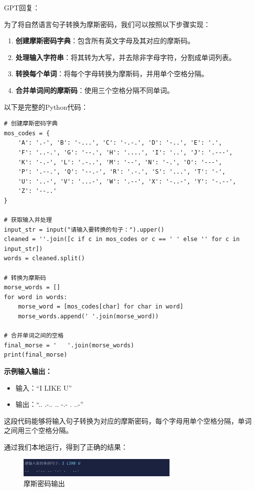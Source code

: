 GPT回复：

为了将自然语言句子转换为摩斯密码，我们可以按照以下步骤实现：

\begin{enumerate}
  \def\labelenumi{\arabic{enumi}.}
  \item
        \textbf{创建摩斯密码字典}：包含所有英文字母及其对应的摩斯码。
  \item
        \textbf{处理输入字符串}：将其转为大写，并去除非字母字符，分割成单词列表。
  \item
        \textbf{转换每个单词}：将每个字母转换为摩斯码，并用单个空格分隔。
  \item
        \textbf{合并单词间的摩斯码}：使用三个空格分隔不同单词。
\end{enumerate}

以下是完整的Python代码：

\begin{lstlisting}
# 创建摩斯密码字典
mos_codes = {
    'A': '.-', 'B': '-...', 'C': '-.-.', 'D': '-..', 'E': '.', 
    'F': '..-.', 'G': '--.', 'H': '....', 'I': '..', 'J': '.---', 
    'K': '-.-', 'L': '.-..', 'M': '--', 'N': '-.', 'O': '---', 
    'P': '.--.', 'Q': '--.-', 'R': '.-.', 'S': '...', 'T': '-', 
    'U': '..-', 'V': '...-', 'W': '.--', 'X': '-..-', 'Y': '-.--', 
    'Z': '--..'
}

# 获取输入并处理
input_str = input("请输入要转换的句子：").upper()
cleaned = ''.join([c if c in mos_codes or c == ' ' else '' for c in input_str])
words = cleaned.split()

# 转换为摩斯码
morse_words = []
for word in words:
    morse_word = [mos_codes[char] for char in word]
    morse_words.append(' '.join(morse_word))

# 合并单词之间的空格
final_morse = '   '.join(morse_words)
print(final_morse)
\end{lstlisting}

\textbf{示例输入输出：}

\begin{itemize}
  \item
        输入：``I LIKE U''
  \item
        输出：``.. .-.. .. -.- . ..-''
\end{itemize}

这段代码能够将输入句子转换为对应的摩斯密码，每个字母用单个空格分隔，单词之间用三个空格分隔。

通过我们本地运行，得到了正确的结果：

\centering
\begin{figure}[H] %
  \centering %
  \includegraphics[width=0.7\textwidth]{assets/figures/image-20250210171257118.png} %
  \caption{摩斯密码输出} %
  \label{Fig.main1} %
\end{figure}%


